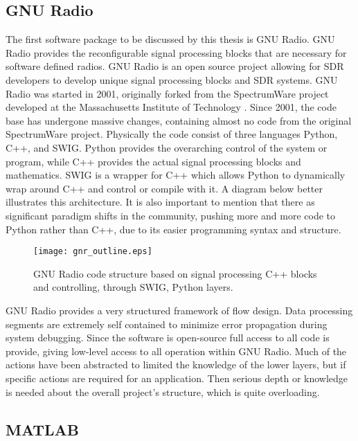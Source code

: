 \subsection{GNU Radio}

The first software package to be discussed by this thesis is GNU Radio.  GNU Radio provides the reconfigurable signal processing blocks that are necessary for software defined radios. GNU Radio is an open source project allowing for SDR developers to develop unique signal processing blocks and SDR systems.  GNU Radio was started in 2001, originally forked from the SpectrumWare project developed at the Massachusetts Institute of Technology \cite{spectrumware}.  Since 2001, the code base has undergone massive changes, containing almost no code from the original SpectrumWare project.  Physically the code consist of three languages Python, C++, and SWIG.  Python provides the overarching control of the system or program, while C++ provides the actual signal processing blocks and mathematics.  SWIG is a wrapper for C++ which allows Python to dynamically wrap around C++ and control or compile with it.  A diagram below better illustrates this architecture.  It is also important to mention that there as significant paradigm shifts in the community, pushing more and more code to Python rather than C++, due to its easier programming syntax and structure.\\

\begin{figure}\label{gnr_struct}
\centering
\texttt{[image: gnr\_outline.eps]}
\caption{GNU Radio code structure based on signal processing C++ blocks and controlling, through SWIG, Python layers.}
\end{figure}

GNU Radio provides a very structured framework of flow design.  Data processing segments are extremely self contained to minimize error propagation during system debugging.  Since the software is open-source full access to all code is provide, giving low-level access to all operation within GNU Radio.  Much of the actions have been abstracted to limited the knowledge of the lower layers, but if specific actions are required for an application.  Then serious depth or knowledge is needed about the overall project's structure, which is quite overloading.\\

\subsection{MATLAB}

